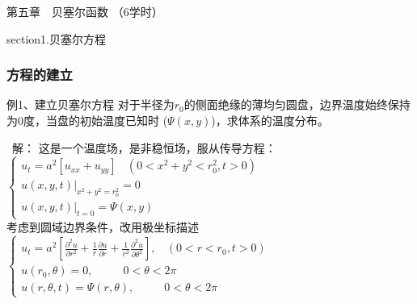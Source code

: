 \begin{frame}
	\frametitle{}
	\Background[1] 
	\begin{center}
	{ {\Huge 第五章~~贝塞尔函数 （6学时）}}
	\end{center}    
\end{frame}

section{1.贝塞尔方程}

\begin{frame}
	\frametitle{方程的建立}
	\begin{exampleblock} {例1、建立贝塞尔方程}
		对于半径为$r_0$的侧面绝缘的薄均匀圆盘，边界温度始终保持为0度，当盘的初始温度已知时 ($\Psi(x,y)$)，求体系的温度分布。
    \end{exampleblock}
	\begin{center}
	\end{center}
\end{frame}	

\begin{frame}
	\alert{ 解：}	这是一个温度场，是非稳恒场，服从传导方程：\\
	$\begin{cases}
		u_t=a^2 [u_{xx}   +u_{yy}] ~~~~ (0< x^2 +y^2 <r_0 ^2, t>0)\\
		u(x,y,t)|_{x^2+y^2=r_0 ^2}= 0 \\
		u(x,y,t)|_{t=0}= \Psi(x,y)
	\end{cases} $\\	
	考虑到圆域边界条件，改用极坐标描述\\
	$\begin{cases}
		\displaystyle	u_t=a^2 [ {	\frac{\partial^2 u }{\partial r^2 } +\frac{1}{r } \frac{\partial u }{\partial r } +
		\frac{1}{r^2 } \frac{\partial ^2 u }{\partial \theta ^2
		} }], ~~~~ (0<r<r_0, t>0)\\
		u(r_0,\theta)=0,~~~~~~~~~~~~ 0<\theta <2\pi 	\\
		u(r,\theta,t )=\Psi(r,\theta) ,~~~~~~~~~~~~ 0<\theta <2\pi 	
	\end{cases} $\\
\end{frame}	

